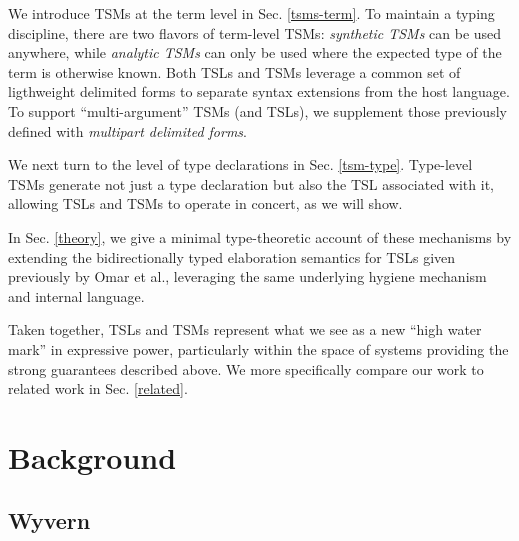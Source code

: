 \documentclass{sig-alternate}
\begin{document}
We introduce TSMs at the term level in Sec. \ref{tsms-term}.  To maintain a typing discipline, there are two flavors of term-level TSMs: \emph{synthetic TSMs} can be used anywhere, while \emph{analytic TSMs} can only be used where the expected type of the term is otherwise known. Both TSLs and TSMs leverage a common set of  ligthweight delimited forms to separate syntax extensions from the host language. To support ``multi-argument'' TSMs (and TSLs), we supplement those previously defined with \emph{multipart delimited forms}. 

We next turn to the level of type declarations  in Sec. \ref{tsm-type}. Type-level TSMs generate not just a type declaration but also the TSL associated with it, allowing TSLs and TSMs to operate in concert, as we will show. 

In Sec. \ref{theory}, we give a minimal type-theoretic account of these mechanisms by extending the bidirectionally typed elaboration semantics for TSLs given previously by Omar et al., leveraging the same underlying hygiene mechanism and internal language.%

Taken together, TSLs and TSMs represent what we see as a new ``high water mark'' in expressive power, particularly within the space of systems providing the strong guarantees described above. We more specifically compare our work to related work in Sec. \ref{related}. 

\section{Background}\label{background}
\subsection{Wyvern}
\end{document}
